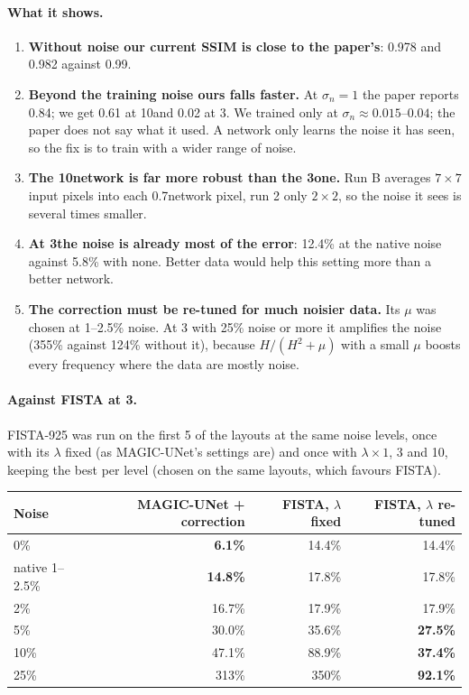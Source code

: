 \paragraph{What it shows.}
\begin{enumerate}
\item \textbf{Without noise our current SSIM is close to the paper's}: 0.978 and 0.982 against 0.99.
\item \textbf{Beyond the training noise ours falls faster.} At $\sigma_n=1$ the paper reports 0.84; we get 0.61 at
10\um and 0.02 at 3\um. We trained only at $\sigma_n\approx0.015$--$0.04$; the paper does not say what it used. A
network only learns the noise it has seen, so the fix is to train with a wider range of noise.
\item \textbf{The 10\um network is far more robust than the 3\um one.} Run B averages $7\times7$ input pixels into
each 0.7\um network pixel, run 2 only $2\times2$, so the noise it sees is several times smaller.
\item \textbf{At 3\um the noise is already most of the error}: 12.4\% at the native noise against 5.8\% with none.
Better data would help this setting more than a better network.
\item \textbf{The correction must be re-tuned for much noisier data.} Its $\mu$ was chosen at 1--2.5\% noise. At 3\um
with 25\% noise or more it amplifies the noise (355\% against 124\% without it), because $H/(H^2+\mu)$ with a small
$\mu$ boosts every frequency where the data are mostly noise.
\end{enumerate}

\paragraph{Against FISTA at 3\um.} FISTA-925 was run on the first 5 of the layouts at the same noise levels, once with
its $\lambda$ fixed (as MAGIC-UNet's settings are) and once with $\lambda\times1$, 3 and 10, keeping the best per level
(chosen on the same layouts, which favours FISTA).

\begin{center}
\small
\begin{tabular}{lrrr}
\toprule
Noise & MAGIC-UNet + correction & FISTA, $\lambda$ fixed & FISTA, $\lambda$ re-tuned \\
\midrule
0\% & \textbf{6.1\%} & 14.4\% & 14.4\% \\
native 1--2.5\% & \textbf{14.8\%} & 17.8\% & 17.8\% \\
2\% & 16.7\% & 17.9\% & 17.9\% \\
5\% & 30.0\% & 35.6\% & \textbf{27.5\%} \\
10\% & 47.1\% & 88.9\% & \textbf{37.4\%} \\
25\% & 313\% & 350\% & \textbf{92.1\%} \\
\bottomrule
\end{tabular}
\end{center}

